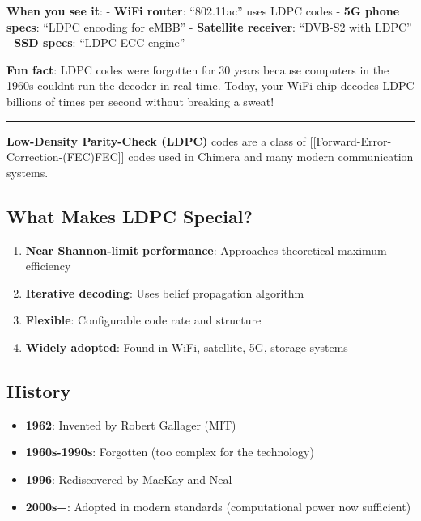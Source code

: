 \textbf{When you see it}: - \textbf{WiFi router}: ``802.11ac'' uses LDPC
codes - \textbf{5G phone specs}: ``LDPC encoding for eMBB'' -
\textbf{Satellite receiver}: ``DVB-S2 with LDPC'' - \textbf{SSD specs}:
``LDPC ECC engine''

\textbf{Fun fact}: LDPC codes were forgotten for 30 years because
computers in the 1960s couldn\textquotesingle t run the decoder in
real-time. Today, your WiFi chip decodes LDPC billions of times per
second without breaking a sweat!

\begin{center}\rule{0.5\linewidth}{0.5pt}\end{center}

\textbf{Low-Density Parity-Check (LDPC)} codes are a class of
{[}{[}Forward-Error-Correction-(FEC)\textbar FEC{]}{]} codes used in
Chimera and many modern communication systems.

\subsection{What Makes LDPC Special?}\label{what-makes-ldpc-special}

\begin{enumerate}
\def\labelenumi{\arabic{enumi}.}
\tightlist
\item
  \textbf{Near Shannon-limit performance}: Approaches theoretical
  maximum efficiency
\item
  \textbf{Iterative decoding}: Uses belief propagation algorithm
\item
  \textbf{Flexible}: Configurable code rate and structure
\item
  \textbf{Widely adopted}: Found in WiFi, satellite, 5G, storage systems
\end{enumerate}

\subsection{History}\label{history}

\begin{itemize}
\tightlist
\item
  \textbf{1962}: Invented by Robert Gallager (MIT)
\item
  \textbf{1960s-1990s}: Forgotten (too complex for the technology)
\item
  \textbf{1996}: Rediscovered by MacKay and Neal
\item
  \textbf{2000s+}: Adopted in modern standards (computational power now
  sufficient)
\end{itemize}

